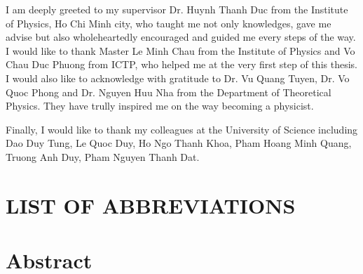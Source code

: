 \documentclass{report}
\begin{document}
I am deeply greeted to my supervisor Dr. Huynh Thanh Duc from the Institute of Physics, Ho Chi Minh city, who taught me not only knowledges, gave me advise but also wholeheartedly encouraged and guided me every steps of the way. I would like to thank Master Le Minh Chau from the Institute of Physics and Vo Chau Duc Phuong from ICTP, who helped me at the very first step of this thesis. I would also like to acknowledge with gratitude to Dr. Vu Quang Tuyen, Dr. Vo Quoc Phong and Dr. Nguyen Huu Nha from the Department of Theoretical Physics. They have trully inspired me on the way becoming a physicist.

Finally, I would like to thank my colleagues at the University of Science including Dao Duy Tung, Le Quoc Duy, Ho Ngo Thanh Khoa, Pham Hoang Minh Quang, Truong Anh Duy, Pham Nguyen Thanh Dat.
\renewcommand{\contentsname}{TABLE OF CONTENTS}
\tableofcontents
\renewcommand{\listfigurename}{LIST OF FIGURES}
\listoffigures
\newpage
\renewcommand{\listtablename}{LIST OF TABLES}
\listoftables
\newpage
\chapter*{\MakeUppercase{List of Abbreviations}}
\begin{acronym} %
	\end{acronym}
\newpage
\chapter*{Abstract}
\end{document}
